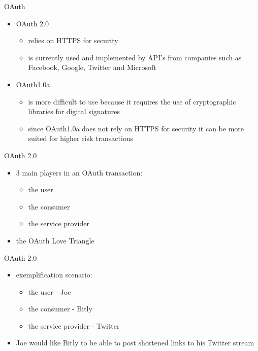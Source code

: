 \documentclass[pdf]{beamer}
\begin{document}
\begin{frame}{OAuth}
\begin{itemize}
\item
OAuth 2.0

\begin{itemize}
\item
relies on HTTPS for security
\item
is currently used and implemented by API's from companies such as Facebook, Google, Twitter and Microsoft
\end{itemize}

\item
OAuth1.0a

\begin{itemize}
\item
is more difficult to use because it requires the use of cryptographic libraries for digital signatures

\item
since OAuth1.0a does not rely on HTTPS for security it can be more suited for higher risk transactions
\end{itemize}

\end{itemize}
\end{frame}



\begin{frame}{OAuth 2.0}
\begin{itemize}
\item
3 main players in an OAuth transaction: 

\begin{itemize}
\item
the user
\item
the consumer
\item
the service provider
\end{itemize}

\item
the OAuth Love Triangle
\newline
\end{itemize}
\end{frame}



\begin{frame}{OAuth 2.0}
\begin{itemize}
\item
exemplification scenario:

\begin{itemize}
\item
the user - Joe
\item
the consumer - Bitly
\item
the service provider - Twitter
\end{itemize}

\item
Joe would like Bitly to be able to post shortened links to his Twitter stream
\end{itemize}
\end{frame}
\end{document}
